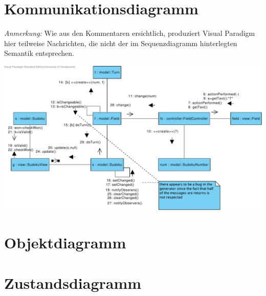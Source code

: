 \documentclass{scrartcl}
\begin{document}
\section{Kommunikationsdiagramm}

\emph{Anmerkung:} Wie aus den Kommentaren ersichtlich, produziert Visual
Paradigm hier teilweise Nachrichten, die nicht der im Sequenzdiagramm
hinterlegten Semantik entsprechen.

\includegraphics[width=\linewidth]{Sudoku-SD - Communications.pdf}

\section{Objektdiagramm}

\section{Zustandsdiagramm}
\end{document}
